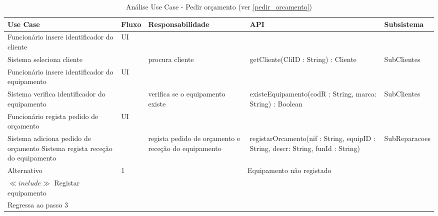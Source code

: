\documentclass[../relatorio.tex]{subfiles}
\begin{document}
\begin{landscape}
    \begin{table}[!h]
        \centering
        \begin{tabular}{|p{5cm}|p{1cm}|p{4cm}|p{6cm}|p{3cm}|}
            \hline
            \rowcolor{gray!20!white}
            Use Case & Fluxo                                            & Responsabilidade & API & Subsistema \\
            \hline
            \rowcolor{yellow}
            Funcionário insere identificador do cliente
                     & UI
                     & 
                     & 
                     & 
            \\
            \hline
            Sistema seleciona cliente
                     & 
                     & procura cliente
                     & getCliente(CliID : String) : Cliente
                     & SubClientes
            \\
            \hline
            \rowcolor{yellow}
            Funcionário insere identificador do equipamento
                     & UI
                     & 
                     & 
                     & 
            \\
            \hline
            Sistema verifica identificador do equipamento
                     & 
                     & verifica se o equipamento existe
                     & existeEquipamento(codR : String, marca: String) : Boolean
                     & SubClientes
            \\
            \hline
			\rowcolor{yellow}
			Funcionário regista pedido de orçamento
                     & UI
                     & 
                     & 
                     & 
            \\
            \hline
			Sistema adiciona pedido de orçamento
            Sistema regista receção do equipamento
                     & 
                     & regista pedido de orçamento e receção do equipamento
                     & registarOrcamento(nif : String, equipID : String, descr: String, funId : String)
                     & SubReparacoes
            \\
            \hline
            \rowcolor{green!30}
            Alternativo  & 1                                               &  \multicolumn{3}{c}{Equipamento não registado}\\
            \hline
            $\ll include \gg$ Registar equipamento
                     & 
                     & 
                     & 
                     & 
            \\
            \hline
			Regressa ao passo 3
                     & 
                     & 
                     & 
                     & 
            \\
            \hline
        \end{tabular}
        \caption{Análise Use Case - Pedir orçamento (ver \ref{pedir_orcamento})}
    \end{table}
\end{landscape}
\end{document}
